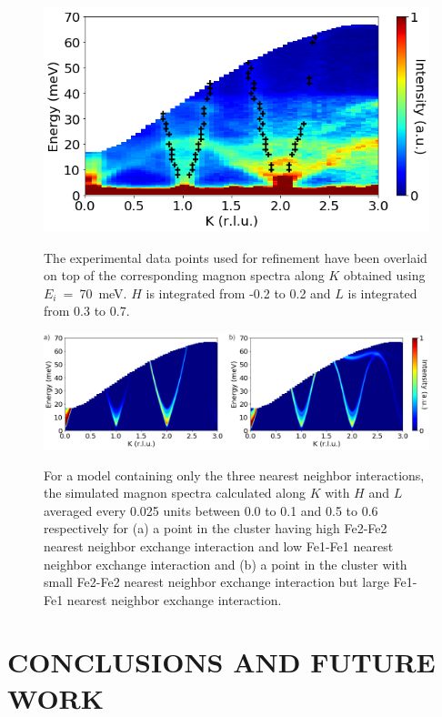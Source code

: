 \documentclass[letterpaper,10pt,doublespacing,edeposit]{uiucthesis2020}
\begin{document}
\begin{mainmatter}
\begin{figure}[h]
\centering\includegraphics[width=0.6\columnwidth]{figures/ch8/exp_data_points_0K0dot5.png} \\
\caption{\label{fig:exp_data_points_01L}
The experimental data points used for refinement have been overlaid on top of the corresponding magnon spectra along $K$ obtained using $E_i$~=~70~meV. $H$ is integrated from -0.2 to 0.2 and $L$ is integrated from 0.3 to 0.7.
} 
\end{figure}


\begin{figure}[h]
\centering\includegraphics[width=\columnwidth]{figures/ch8/suppl_simulated_magnon_spectra_3J.png} \\
\caption{\label{fig:3J_spinw_refinement}
For a model containing only the three nearest neighbor interactions, the simulated magnon spectra calculated along $K$ with $H$ and $L$ averaged every 0.025 units between 0.0 to 0.1 and 0.5 to 0.6 respectively for (a) a point in the cluster having high Fe2-Fe2 nearest neighbor exchange interaction and low Fe1-Fe1 nearest neighbor exchange interaction and (b) a point in the cluster with small Fe2-Fe2 nearest neighbor exchange interaction but large Fe1-Fe1 nearest neighbor exchange interaction.
}
\end{figure}


\chapter{CONCLUSIONS AND FUTURE WORK}


\end{mainmatter}
\end{document}
